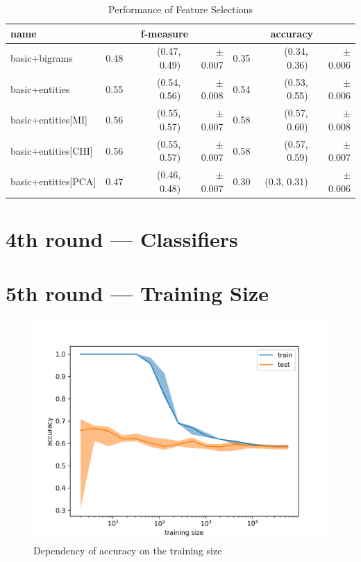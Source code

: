 \begin{table}[h!]
\begin{tabular}{lr@{~}r@{~}rr@{~}r@{~}r}
\toprule
\textbf{name}	& \multicolumn{3}{c}{\textbf{f-measure}} & \multicolumn{3}{c}{\textbf{accuracy}} \\

\midrule
basic+bigrams & 0.48 & (0.47, 0.49) & $\pm$ 0.007 & 0.35 & (0.34, 0.36) & $\pm$ 0.006		\\

\midrule
basic+entities & 0.55 & (0.54, 0.56) & $\pm$ 0.008 & 0.54 & (0.53, 0.55) & $\pm$ 0.006		\\
basic+entities[MI] & 0.56 & (0.55, 0.57) & $\pm$ 0.007 & 0.58 & (0.57, 0.60) & $\pm$ 0.008 \\
basic+entities[CHI] & 0.56 & (0.55, 0.57) & $\pm$ 0.007 & 0.58 & (0.57, 0.59) & $\pm$ 0.007 \\
basic+entities[PCA] & 0.47 & (0.46, 0.48) & $\pm$ 0.007 & 0.30 & (0.3, 0.31) & $\pm$ 0.006 \\


\bottomrule
\end{tabular}

\caption{Performance of Feature Selections}\label{tab:sel_perf}
\end{table}

\section{4th round --- Classifiers}

\section{5th round --- Training Size}

\begin{figure}[h]\centering
\includegraphics[width=130mm]{figures/l_curves_accuracy.png}
\caption{Dependency of accuracy on the training size}
\label{fig:l_curves_accuracy}
\end{figure}

